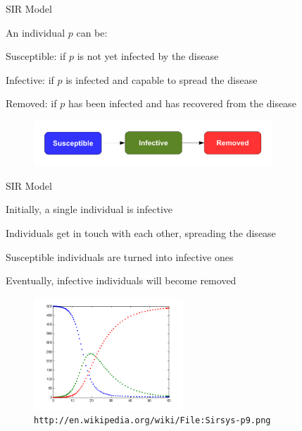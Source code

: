 \begin{frame}{SIR Model}

\begin{definition}
An individual $p$ can be:
\BIL
\item \alert{Susceptible}: if $p$ is not yet infected by the disease
\item \alert{Infective}: if $p$ is infected and capable to spread the disease
\item \alert{Removed}: if $p$ has been infected and has recovered from the disease
\EIL
\end{definition}

\begin{figure}
	\includegraphics[width=0.8\textwidth]{model-sir}
\end{figure}

\end{frame}

\begin{frame}{SIR Model}

\BI
\item Initially, a single individual is infective
\item Individuals get in touch with each other, spreading the disease
\item Susceptible individuals are turned into infective ones
\item Eventually, infective individuals will become removed
\EI

\begin{figure}
	\includegraphics[width=0.5\textwidth]{model-sir-data}\\
	\vspace{-0.5cm}
	\texttt{\tiny http://en.wikipedia.org/wiki/File:Sirsys-p9.png}
\end{figure}


\end{frame}

